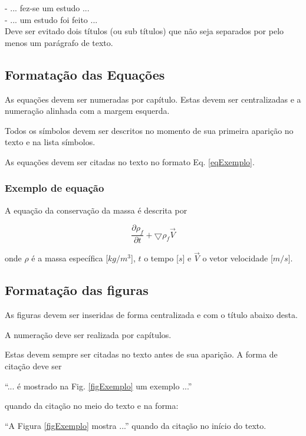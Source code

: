 \documentclass[a4paper,12pt,oneside]{article}
\numberwithin{equation}{section}
\begin{document}
\noindent- ... fez-se um estudo ...\\
- ... um estudo foi feito ...\\



Deve ser evitado dois títulos (ou sub títulos) que não seja separados por pelo menos um
parágrafo de texto.


\subsection{Formatação das Equações}

As equações devem ser numeradas por capítulo. Estas devem ser centralizadas e a numeração alinhada com a margem esquerda.


Todos os símbolos devem ser descritos no momento de sua primeira aparição no texto e na lista símbolos.


As equações devem ser citadas no texto no formato Eq. \ref{eqExemplo}.


\subsubsection{Exemplo de equação}

A equação da conservação da massa é descrita por

\begin{equation}
\frac{\partial\rho_{f}}{\partial t} + \bigtriangledown \rho_{f} \vec{V}
\label{eqExemplo}
\end{equation}

onde $\rho$ é a massa específica [$kg/m^{3}$], $t$ o tempo [$s$] e  $\vec{V}$ o vetor velocidade [$m/s$].

\subsection{Formatação das figuras}

As figuras devem ser inseridas de forma centralizada e com o título abaixo desta.

A numeração deve ser realizada por capítulos.

Estas devem sempre ser citadas no texto antes de sua aparição. A forma de citação deve ser 


“... é mostrado na Fig. \ref{figExemplo} um exemplo ...” 

quando da citação no meio do texto e na forma:

 “A Figura \ref{figExemplo} mostra ...” quando da citação no início do texto.
 
\end{document}
